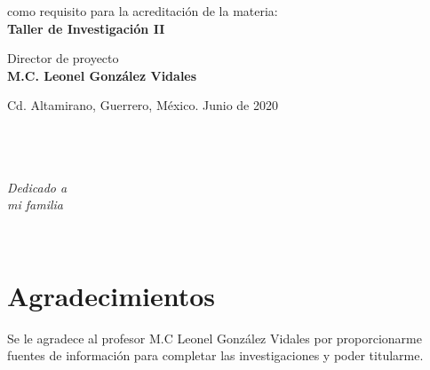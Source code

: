 \documentclass[letterpaper,oneside,openany,11pt]{book}
\begin{document}
\begin{titlepage}
\begin{center}
		\begin{large}
			como requisito para la acreditación de la materia: \\
			\vspace*{0.1in}
			\textbf{Taller de Investigación II} \\
		\end{large}
		\vspace*{0.4in}
		
		\begin{large}
			Director de proyecto \\
			\vspace*{0.1in}
			\textbf{M.C. Leonel González Vidales} \\
		\end{large}
		\vspace*{0.4in}
	
		
		\vspace*{0.25in}
		\small
		Cd. Altamirano, Guerrero, México. \hfill Junio de 2020\\
		
	\end{center}
	
\end{titlepage}

\newpage
$\ $
\thispagestyle{empty} %

\chapter*{}

\begin{flushright}
 	\textit{Dedicado a \\
		mi familia}
 \end{flushright}
\thispagestyle{empty} %
 
\newpage
$\ $
\thispagestyle{empty} %

\chapter*{Agradecimientos} %
\noindent Se le agradece al profesor M.C Leonel González Vidales por proporcionarme fuentes de información para completar las investigaciones y poder titularme.\\
\end{document}
